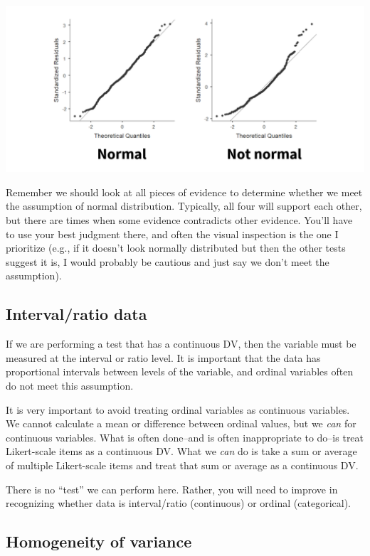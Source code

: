 \documentclass[
]{book}
\begin{document}
\includegraphics{images/06-inferential/qqplot.png}

Remember we should look at all pieces of evidence to determine whether we meet the assumption of normal distribution. Typically, all four will support each other, but there are times when some evidence contradicts other evidence. You'll have to use your best judgment there, and often the visual inspection is the one I prioritize (e.g., if it doesn't look normally distributed but then the other tests suggest it is, I would probably be cautious and just say we don't meet the assumption).

\hypertarget{intervalratio-data}{%
\subsection{Interval/ratio data}\label{intervalratio-data}}

If we are performing a test that has a continuous DV, then the variable must be measured at the interval or ratio level. It is important that the data has proportional intervals between levels of the variable, and ordinal variables often do not meet this assumption.

It is very important to avoid treating ordinal variables as continuous variables. We cannot calculate a mean or difference between ordinal values, but we \emph{can} for continuous variables. What is often done--and is often inappropriate to do--is treat Likert-scale items as a continuous DV. What we \emph{can} do is take a sum or average of multiple Likert-scale items and treat that sum or average as a continuous DV.

There is no ``test'' we can perform here. Rather, you will need to improve in recognizing whether data is interval/ratio (continuous) or ordinal (categorical).

\hypertarget{homogeneity-of-variance}{%
\subsection{Homogeneity of variance}\label{homogeneity-of-variance}}
\end{document}
